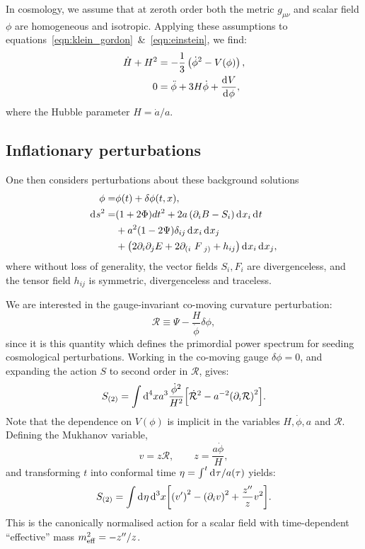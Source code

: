 In cosmology, we assume that at zeroth order both the metric $g_{\mu\nu}$ and scalar field $\phi$ are homogeneous and isotropic. Applying these assumptions to equations~\eqref{eqn:klein_gordon}~\&~\eqref{eqn:einstein}, we find:
\begin{align}
  \dot{H}+H^2 &= -\frac{1}{3}\left( \dot{\phi}^2 - V(\phi) \right),
  \label{eqn:Raychaudhuri}\\
  0&=\ddot{\phi} + 3H\dot{\phi} + \frac{\operatorname{d}^{}\!{V}}{\operatorname{d}^{}\!{\phi}},
\end{align}
where the Hubble parameter $H = \dot{a}/a$.
\subsection{Inflationary perturbations}
One then considers perturbations about these background solutions 
\begin{align}
  \phi=&\phi(t) + \delta\phi(t,x),
  \label{eqn:phi_perturbation} \\
  \d{s}^2 =& (1+2\Phi)dt^2 + 2a\left( \partial_i B-S_i \right)\d{x_i} \d{t} \nonumber\\
  &+a^2(1-2\Psi)\delta_{ij} \d{x_i} \d{x_j} \nonumber\\
  &+\left( 2\partial_i\partial_j E + 2\partial_{(i\phantom)}F_{\phantom(j)} + h_{ij} \right) \d{x_i}\d{x_j},
\end{align}
where without loss of generality, the vector fields $S_i,F_i$ are divergenceless, and the tensor field $h_{ij}$ is symmetric, divergenceless and traceless.

We are interested in the gauge-invariant co-moving curvature perturbation:
\begin{equation}
  \mathcal{R}\equiv \Psi - \frac{H}{\dot{\phi}}\delta\phi,
  \label{eqn:R_action}
\end{equation}
since it is this quantity which defines the primordial power spectrum for seeding cosmological perturbations. Working in the co-moving gauge $\delta\phi=0$, and expanding the action $S$ to second order in $\mathcal{R}$, gives:
\begin{equation}
  S_{(2)} =  \int \d[4]{x} a^3\frac{\dot{\phi}^2}{H^2}{\left[ \dot{\mathcal{R}}^2 - a^{-2} {\left( \partial_i\mathcal{R} \right)}^2 \right]}.
  \label{eqn:S2_action}
\end{equation}
Note that the dependence on $V(\phi)$ is implicit in the variables $H,\dot{\phi},a$ and $\mathcal{R}$.
Defining the Mukhanov variable,
\begin{equation}
  v = z\mathcal{R},\qquad z=\frac{a\dot{\phi}}{H},
  \label{eqn:mukhanov_variable}
\end{equation}
and transforming $t$ into conformal time $\eta = \int^t \operatorname{d}^{}\!{\tau}/a(\tau) $ yields:
\begin{equation}                                 
  S_{(2)} =  \int \d{\eta} \d[3]{x} {\left[ {\left( \prm{v} \right)}^2 - {\left( \partial_i v \right)}^2 + \frac{\dprm{z}}{z} v^2 \right]}.
  \label{eqn:v_action}
\end{equation}
This is the canonically normalised action for a scalar field with time-dependent ``effective'' mass $m_\mathrm{eff}^2 = -{{z}^{\prime\prime}}/z$.

